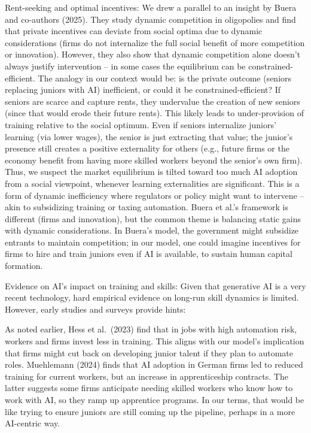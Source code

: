 \documentclass[12pt]{article}
\begin{document}
{{Rent-seeking and optimal incentives:} We drew a parallel to an
insight by Buera and co-authors (2025). They study dynamic competition
in oligopolies and find that private incentives can deviate from
social optima due to dynamic considerations (firms do not internalize
the full social benefit of more competition or innovation). However,
they also show that {dynamic competition alone doesn't always
justify intervention} -- in some cases the equilibrium can be
constrained-efficient. The analogy in our context would be: is the
private outcome (seniors replacing juniors with AI) inefficient, or
could it be constrained-efficient? If seniors are scarce and capture
rents, they undervalue the creation of new seniors (since that would
erode their future rents). This likely leads to {under-provision
of training} relative to the social optimum. Even if seniors
internalize juniors' learning (via lower wages), the senior is just
extracting that value; the junior's presence still creates a positive
externality for others (e.g., future firms or the economy benefit from
having more skilled workers beyond the senior's own firm). Thus, we
suspect the market equilibrium is tilted toward too much AI adoption
from a social viewpoint, whenever learning externalities are
significant. This is a form of dynamic inefficiency where regulators
or policy might want to intervene -- akin to subsidizing training or
taxing automation. Buera et al.'s framework is different (firms and
innovation), but the common theme is balancing static gains with
dynamic considerations. In Buera's model, the government might
subsidize entrants to maintain competition; in our model, one could
imagine {incentives for firms to hire and train juniors} even
if AI is available, to sustain human capital formation.

{Evidence on AI's impact on training and skills:} Given that
generative AI is a very recent technology, hard empirical evidence on
long-run skill dynamics is limited. However, early studies and surveys
provide hints:

As noted earlier, Hess et al.~(2023) find that in jobs with high
automation risk, {workers and firms invest less in training}.
This aligns with our model's implication that firms might cut back
on developing junior talent if they plan to automate roles.
Muehlemann (2024) finds that {AI adoption in German firms led
to reduced training for current workers, but an increase in
apprenticeship contracts}. The latter suggests some firms anticipate
needing skilled workers who know how to work with AI, so they ramp
up apprentice programs. In our terms, that would be like trying to
ensure juniors are still coming up the pipeline, perhaps in a more
AI-centric way.

}
\end{document}
